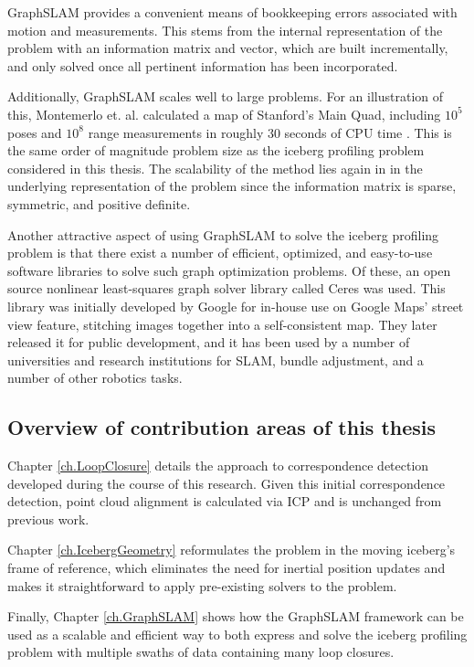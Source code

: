 GraphSLAM provides a convenient means of bookkeeping errors associated with motion and measurements. This stems from the internal representation of the problem with an information matrix and vector, which are built incrementally, and only solved once all pertinent information has been incorporated. 


Additionally, GraphSLAM scales well to large problems. For an illustration of this, Montemerlo et. al. calculated a map of Stanford's Main Quad, including $10^5$ poses and $10^8$ range measurements in roughly 30 seconds of CPU time \cite{?}. This is the same order of magnitude problem size as the iceberg profiling problem considered in this thesis. The scalability of the method lies again in in the underlying representation of the problem since the information matrix is sparse, symmetric, and positive definite.

Another attractive aspect of using GraphSLAM to solve the iceberg profiling problem is that there exist a number of efficient, optimized, and easy-to-use software libraries to solve such graph optimization problems. Of these, an open source nonlinear least-squares graph solver library called Ceres was used. This library was initially developed by Google for in-house use on Google Maps' street view feature, stitching images together into a self-consistent map. They later released it for public development, and it has been used by a number of universities and research institutions for SLAM, bundle adjustment, and a number of other robotics tasks. \cite{ceres}

\subsection{Overview of contribution areas of this thesis}

Chapter \ref{ch.LoopClosure} details the approach to correspondence detection developed during the course of this research. Given this initial correspondence detection, point cloud alignment is calculated via ICP and is unchanged from previous work.

Chapter \ref{ch.IcebergGeometry} reformulates the problem in the moving iceberg's frame of reference, which eliminates the need for inertial position updates and makes it straightforward to apply pre-existing solvers to the problem.

Finally, Chapter \ref{ch.GraphSLAM} shows how the GraphSLAM framework can be used as a scalable and efficient way to both express and solve the iceberg profiling problem with multiple swaths of data containing many loop closures.

